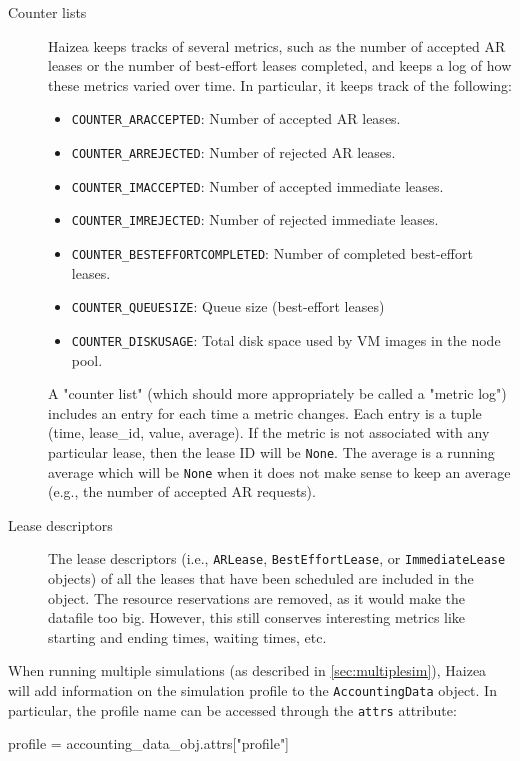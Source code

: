 \begin{description}
 \item[Counter lists] Haizea keeps tracks of several metrics, such as the number of accepted AR leases or the number of best-effort leases completed, and keeps a log of how these metrics varied over time. In particular, it keeps track of the following:
\begin{itemize}

 \item \texttt{COUNTER\_ARACCEPTED}: Number of accepted AR leases.
 \item \texttt{COUNTER\_ARREJECTED}: Number of rejected AR leases.
 \item \texttt{COUNTER\_IMACCEPTED}: Number of accepted immediate leases.
 \item \texttt{COUNTER\_IMREJECTED}: Number of rejected immediate leases.
 \item \texttt{COUNTER\_BESTEFFORTCOMPLETED}: Number of completed best-effort leases.
 \item \texttt{COUNTER\_QUEUESIZE}: Queue size (best-effort leases)
 \item \texttt{COUNTER\_DISKUSAGE}: Total disk space used by VM images in the node pool.
\end{itemize}
      A "counter list" (which should more appropriately be called a "metric log") includes an entry for each time a metric changes. Each entry is a tuple (time, lease\_id, value, average). If the metric is not associated with any particular lease, then the lease ID will be \texttt{None}. The average is a running average which will be \texttt{None} when it does not make sense to keep an average (e.g., the number of accepted AR requests).
\item[Lease descriptors] The lease descriptors (i.e., \texttt{ARLease}, \texttt{BestEffortLease}, or \texttt{ImmediateLease} objects) of all the leases that have been scheduled are included in the object. The resource reservations are removed, as it would make the datafile too big. However, this still conserves interesting metrics like starting and ending times, waiting times, etc.
\end{description}

When running multiple simulations (as described in \ref{sec:multiplesim}), Haizea will add information on the simulation profile to the \texttt{AccountingData} object. In particular, the profile name can be accessed through the \texttt{attrs} attribute:

\begin{wideshellverbatim}
profile = accounting_data_obj.attrs["profile"]
\end{wideshellverbatim}
